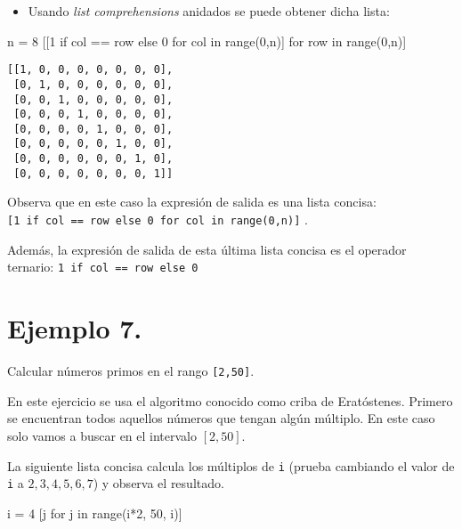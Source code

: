 \documentclass[
  letterpaper,
  DIV=11,
  numbers=noendperiod]{scrreprt}
\newenvironment{Shaded}{\begin{snugshade}}{\end{snugshade}}
\newcommand{\BuiltInTok}[1]{\textcolor[rgb]{0.00,0.23,0.31}{#1}}
\newcommand{\ControlFlowTok}[1]{\textcolor[rgb]{0.00,0.23,0.31}{#1}}
\newcommand{\DecValTok}[1]{\textcolor[rgb]{0.68,0.00,0.00}{#1}}
\newcommand{\KeywordTok}[1]{\textcolor[rgb]{0.00,0.23,0.31}{#1}}
\newcommand{\NormalTok}[1]{\textcolor[rgb]{0.00,0.23,0.31}{#1}}
\newcommand{\OperatorTok}[1]{\textcolor[rgb]{0.37,0.37,0.37}{#1}}
\providecommand{\tightlist}{%
  \setlength{\itemsep}{0pt}\setlength{\parskip}{0pt}}\usepackage{longtable,booktabs,array}
\begin{document}
\begin{itemize}
\tightlist
\item
  Usando \emph{list comprehensions} anidados se puede obtener dicha
  lista:
\end{itemize}

\begin{Shaded}
\begin{Highlighting}[]
\NormalTok{n }\OperatorTok{=} \DecValTok{8}
\NormalTok{[[}\DecValTok{1} \ControlFlowTok{if}\NormalTok{ col }\OperatorTok{==}\NormalTok{ row }\ControlFlowTok{else} \DecValTok{0} \ControlFlowTok{for}\NormalTok{ col }\KeywordTok{in} \BuiltInTok{range}\NormalTok{(}\DecValTok{0}\NormalTok{,n)] }\ControlFlowTok{for}\NormalTok{ row }\KeywordTok{in} \BuiltInTok{range}\NormalTok{(}\DecValTok{0}\NormalTok{,n)]}
\end{Highlighting}
\end{Shaded}

\begin{verbatim}
[[1, 0, 0, 0, 0, 0, 0, 0],
 [0, 1, 0, 0, 0, 0, 0, 0],
 [0, 0, 1, 0, 0, 0, 0, 0],
 [0, 0, 0, 1, 0, 0, 0, 0],
 [0, 0, 0, 0, 1, 0, 0, 0],
 [0, 0, 0, 0, 0, 1, 0, 0],
 [0, 0, 0, 0, 0, 0, 1, 0],
 [0, 0, 0, 0, 0, 0, 0, 1]]
\end{verbatim}

Observa que en este caso la expresión de salida es una lista concisa:
\texttt{{[}1\ if\ col\ ==\ row\ else\ 0\ for\ col\ in\ range(0,n){]}} .

Además, la expresión de salida de esta última lista concisa es el
operador ternario: \texttt{1\ if\ col\ ==\ row\ else\ 0}

\section{\texorpdfstring{\textbf{Ejemplo
7.}}{Ejemplo 7.}}\label{ejemplo-7.-2}

Calcular números primos en el rango \texttt{{[}2,50{]}}.

En este ejercicio se usa el algoritmo conocido como criba de
Eratóstenes. Primero se encuentran todos aquellos números que tengan
algún múltiplo. En este caso solo vamos a buscar en el intervalo
\([2,50]\).

La siguiente lista concisa calcula los múltiplos de \texttt{i} (prueba
cambiando el valor de \texttt{i} a \(2,3,4,5,6,7\)) y observa el
resultado.

\begin{Shaded}
\begin{Highlighting}[]
\NormalTok{i }\OperatorTok{=} \DecValTok{4}
\NormalTok{[j }\ControlFlowTok{for}\NormalTok{ j }\KeywordTok{in} \BuiltInTok{range}\NormalTok{(i}\OperatorTok{*}\DecValTok{2}\NormalTok{, }\DecValTok{50}\NormalTok{, i)]}
\end{Highlighting}
\end{Shaded}
\end{document}
